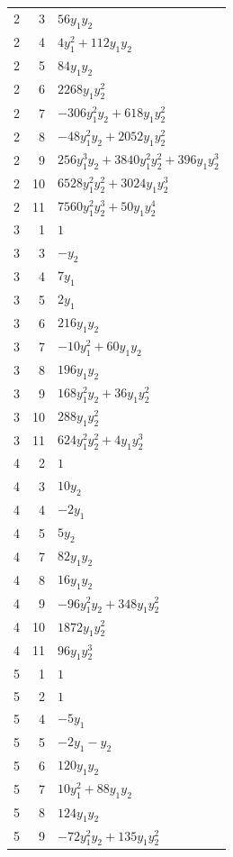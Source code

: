 \documentclass[10pt,a4paper]{article}
\begin{document}
{\begin{longtable}{rrp{125mm}}
2 & 3 & $56 y_{1} y_{2}$\\
2 & 4 & $4 y_{1}^{2} + 112 y_{1} y_{2}$\\
2 & 5 & $84 y_{1} y_{2}$\\
2 & 6 & $2268 y_{1} y_{2}^{2}$\\
2 & 7 & $- 306 y_{1}^{2} y_{2} + 618 y_{1} y_{2}^{2}$\\
2 & 8 & $- 48 y_{1}^{2} y_{2} + 2052 y_{1} y_{2}^{2}$\\
2 & 9 & $256 y_{1}^{3} y_{2} + 3840 y_{1}^{2} y_{2}^{2} + 396 y_{1} y_{2}^{3}$\\
2 & 10 & $6528 y_{1}^{2} y_{2}^{2} + 3024 y_{1} y_{2}^{3}$\\
2 & 11 & $7560 y_{1}^{2} y_{2}^{3} + 50 y_{1} y_{2}^{4}$\\
3 & 1 & $1$\\
3 & 3 & $- y_{2}$\\
3 & 4 & $7 y_{1}$\\
3 & 5 & $2 y_{1}$\\
3 & 6 & $216 y_{1} y_{2}$\\
3 & 7 & $- 10 y_{1}^{2} + 60 y_{1} y_{2}$\\
3 & 8 & $196 y_{1} y_{2}$\\
3 & 9 & $168 y_{1}^{2} y_{2} + 36 y_{1} y_{2}^{2}$\\
3 & 10 & $288 y_{1} y_{2}^{2}$\\
3 & 11 & $624 y_{1}^{2} y_{2}^{2} + 4 y_{1} y_{2}^{3}$\\
4 & 2 & $1$\\
4 & 3 & $10 y_{2}$\\
4 & 4 & $- 2 y_{1}$\\
4 & 5 & $5 y_{2}$\\
4 & 7 & $82 y_{1} y_{2}$\\
4 & 8 & $16 y_{1} y_{2}$\\
4 & 9 & $- 96 y_{1}^{2} y_{2} + 348 y_{1} y_{2}^{2}$\\
4 & 10 & $1872 y_{1} y_{2}^{2}$\\
4 & 11 & $96 y_{1} y_{2}^{3}$\\
5 & 1 & $1$\\
5 & 2 & $1$\\
5 & 4 & $- 5 y_{1}$\\
5 & 5 & $- 2 y_{1} - y_{2}$\\
5 & 6 & $120 y_{1} y_{2}$\\
5 & 7 & $10 y_{1}^{2} + 88 y_{1} y_{2}$\\
5 & 8 & $124 y_{1} y_{2}$\\
5 & 9 & $- 72 y_{1}^{2} y_{2} + 135 y_{1} y_{2}^{2}$\\

\end{longtable}}
\end{document}
